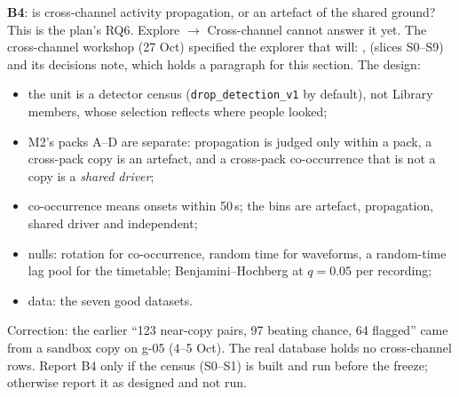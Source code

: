 \begin{instructions}
\textbf{B4}: is cross-channel activity propagation, or an artefact of the shared ground? This is the plan's RQ6.
Explore $\rightarrow$ Cross-channel cannot answer it yet. The cross-channel workshop (27 Oct) specified the explorer that
will: ,  (slices S0--S9)
and its decisions note, which holds a paragraph for this section. The design:
\begin{itemize}
  \item the unit is a detector census (\texttt{drop\_detection\_v1} by default), not Library members, whose selection
        reflects where people looked;
  \item M2's packs A--D are separate: propagation is judged only within a pack, a cross-pack copy is an artefact, and
        a cross-pack co-occurrence that is not a copy is a \emph{shared driver};
  \item co-occurrence means onsets within 50\,s; the bins are artefact, propagation, shared driver and independent;
  \item nulls: rotation for co-occurrence, random time for waveforms, a random-time lag pool for the timetable;
        Benjamini--Hochberg at $q=0.05$ per recording;
  \item data: the seven good datasets.
\end{itemize}
Correction: the earlier ``123 near-copy pairs, 97 beating chance, 64 flagged'' came from a sandbox copy on g-05
(4--5 Oct). The real database holds no cross-channel rows. Report B4 only if the census (S0--S1) is built and run
before the freeze; otherwise report it as designed and not run.


\end{instructions}
